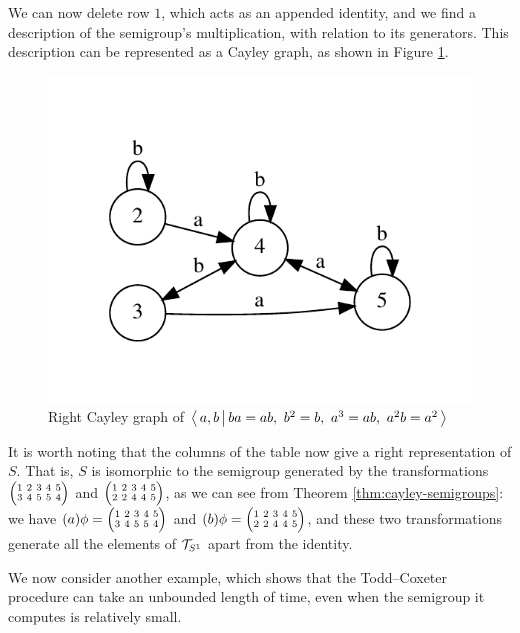 \begin{example}
We can now delete row $1$, which acts as an appended identity, and we find a
description of the semigroup's multiplication, with relation to its generators.
This description can be represented as a Cayley graph,
as shown in Figure \ref{fig:tc-cayley-graph}.
\begin{figure}[H]
  \centering
  \vspace{-4.0em}
  \includegraphics{pics/ch-pairs/tc-cayley-graph}
  \vspace{-4.0em}
  \caption[Todd--Coxeter example: right Cayley graph]
  {Right Cayley graph of $\left\langle \, a, b \, \middle| \, ba=ab,\ b^2=b,\ a^3=ab,\ a^2b=a^2 \, \right\rangle$}
  \label{fig:tc-cayley-graph}
\end{figure}
It is worth noting that the columns of the table now give a right representation
of $S$.  That is, $S$ is isomorphic to the semigroup generated by the
transformations $\transV 34554$ and $\transV 22445$, as we can see from Theorem
\ref{thm:cayley-semigroups}: we have $(a)\phi = \transV 34554$ and
$(b)\phi = \transV 22445$, and these two transformations generate all the
elements of $\mathcal{T}_{S^1}$ apart from the identity.
\end{example}

We now consider another example, which shows that the Todd--Coxeter procedure can
take an unbounded length of time, even when the semigroup it computes is
relatively small.

